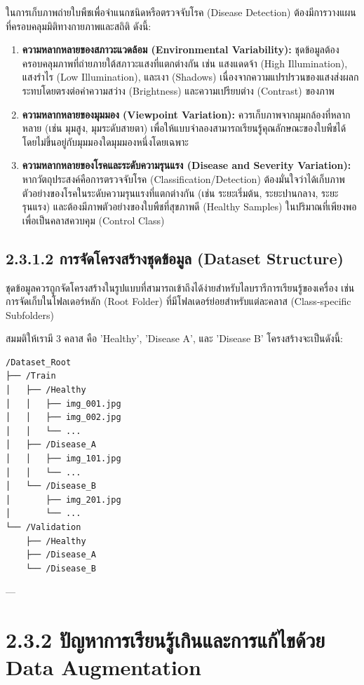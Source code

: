 \documentclass[11pt,a4paper,openany]{report}
\begin{document}
ในการเก็บภาพถ่ายใบพืชเพื่อจำแนกชนิดหรือตรวจจับโรค (Disease Detection) ต้องมีการวางแผนที่ครอบคลุมมิติทางกายภาพและสถิติ ดังนี้:

\begin{enumerate}
  \item \textbf{ความหลากหลายของสภาวะแวดล้อม (Environmental Variability):} ชุดข้อมูลต้องครอบคลุมภาพที่ถ่ายภายใต้สภาวะแสงที่แตกต่างกัน เช่น แสงแดดจ้า (High Illumination), แสงรำไร (Low Illumination), และเงา (Shadows) เนื่องจากความแปรปรวนของแสงส่งผลกระทบโดยตรงต่อค่าความสว่าง (Brightness) และความเปรียบต่าง (Contrast) ของภาพ
  \item \textbf{ความหลากหลายของมุมมอง (Viewpoint Variation):} ควรเก็บภาพจากมุมกล้องที่หลากหลาย (เช่น มุมสูง, มุมระดับสายตา) เพื่อให้แบบจำลองสามารถเรียนรู้คุณลักษณะของใบพืชได้โดยไม่ขึ้นอยู่กับมุมมองใดมุมมองหนึ่งโดยเฉพาะ
  \item \textbf{ความหลากหลายของโรคและระดับความรุนแรง (Disease and Severity Variation):} หากวัตถุประสงค์คือการตรวจจับโรค (Classification/Detection) ต้องมั่นใจว่าได้เก็บภาพตัวอย่างของโรคในระดับความรุนแรงที่แตกต่างกัน (เช่น ระยะเริ่มต้น, ระยะปานกลาง, ระยะรุนแรง) และต้องมีภาพตัวอย่างของใบพืชที่สุขภาพดี (Healthy Samples) ในปริมาณที่เพียงพอเพื่อเป็นคลาสควบคุม (Control Class)
\end{enumerate}


\subsection{2.3.1.2 การจัดโครงสร้างชุดข้อมูล (Dataset Structure)}


ชุดข้อมูลควรถูกจัดโครงสร้างในรูปแบบที่สามารถเข้าถึงได้ง่ายสำหรับไลบรารีการเรียนรู้ของเครื่อง เช่น การจัดเก็บในโฟลเดอร์หลัก (Root Folder) ที่มีโฟลเดอร์ย่อยสำหรับแต่ละคลาส (Class-specific Subfolders)

สมมติให้เรามี 3 คลาส คือ 'Healthy', 'Disease A', และ 'Disease B' โครงสร้างจะเป็นดังนี้:

\begin{lstlisting}[language=TeX]
/Dataset_Root
├── /Train
│   ├── /Healthy
│   │   ├── img_001.jpg
│   │   ├── img_002.jpg
│   │   └── ...
│   ├── /Disease_A
│   │   ├── img_101.jpg
│   │   └── ...
│   └── /Disease_B
│       ├── img_201.jpg
│       └── ...
└── /Validation
    ├── /Healthy
    ├── /Disease_A
    └── /Disease_B
\end{lstlisting}


---

\section{2.3.2 ปัญหาการเรียนรู้เกินและการแก้ไขด้วย Data Augmentation}
\end{document}
